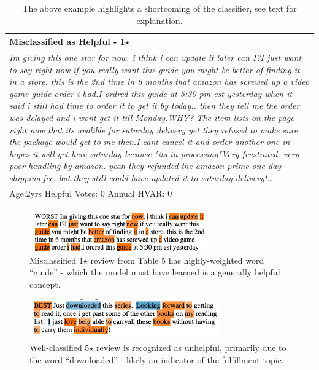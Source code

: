 \documentclass[10pt, a4paper, twocolumn]{article}
\begin{document}
\begin{table}
  \begin{tabular}{| p{7cm} |}
      \hline
\textbf{Misclassified as Helpful - 1$\star$} \\
\hline
 \textit{Im giving this one star for now. i think i can update it later can I?I just want to say right now if you really want this guide you might be better of finding it in a store. this is the 2nd time in 6 months that amazon has screwed up a video game guide order i had.I ordred this guide at 5:30 pm est yesterday when it said i still had time to order it to get it by today.. then they tell me the order was delayed and i wont get it till Monday.WHY? The item lists on the page right now that its avalible for saturday delivery yet they refused to make sure the package would get to me then.I cant cancel it and order another one in hopes it will get here saturday because "its in processing"Very frustrated. very poor handling by amazon. yeah they refunded the amazon prime one day shipping fee. but they still could have updated it to saturday delivery!…} \\
    \hline
Age:2yrs     Helpful Votes: 0    Annual HVAR: 0
\\
    \hline
  \end{tabular}
  \caption{The above example highlights a shortcoming of the classifier, see text for explanation.}
\end{table}

\begin{figure}[ht]
\includegraphics[width=3in]{LIME_review_of_shipping_video_game_guide.png}
\caption{Misclassified 1$\star$ review from Table 5 has highly-weighted word “guide” - which the model must have learned is a generally helpful concept.}
\end{figure}

\begin{figure}[ht]
\includegraphics[width=3.25in]{LIME_review_just_downloaded.png}
\caption{Well-classified 5$\star$ review is recognized as unhelpful, primarily due to the word “downloaded” - likely an indicator of the fulfillment topic.}
\end{figure}
\end{document}
